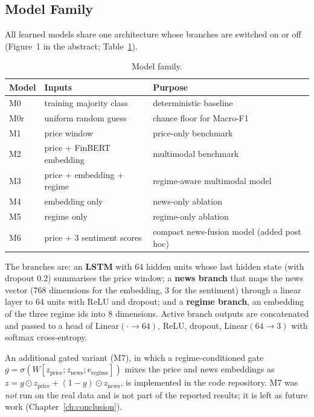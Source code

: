 \subsection{Model Family}
All learned models share one architecture whose branches are switched on or off (Figure~1 in the abstract; Table~\ref{tab:models}).
\begin{table}[H]
\centering
\begin{tabular}{llp{6.6cm}}
\toprule
Model & Inputs & Purpose\\
\midrule
M0 & training majority class & deterministic baseline\\
M0r & uniform random guess & chance floor for Macro-F1\\
M1 & price window & price-only benchmark\\
M2 & price + FinBERT embedding & multimodal benchmark\\
M3 & price + embedding + regime & regime-aware multimodal model\\
M4 & embedding only & news-only ablation\\
M5 & regime only & regime-only ablation\\
M6 & price + 3 sentiment scores & compact news-fusion model (added post hoc)\\
\bottomrule
\end{tabular}
\caption{Model family.}\label{tab:models}
\end{table}
The branches are: an \textbf{LSTM} \cite{hochreiter1997} with 64 hidden units whose last hidden state (with dropout 0.2) summarises the price window; a \textbf{news branch} that maps the news vector (768 dimensions for the embedding, 3 for the sentiment) through a linear layer to 64 units with ReLU and dropout; and a \textbf{regime branch}, an embedding of the three regime ids into 8 dimensions. Active branch outputs are concatenated and passed to a head of Linear$(\cdot\to64)$, ReLU, dropout, Linear$(64\to3)$ with softmax cross-entropy.

An additional gated variant (M7), in which a regime-conditioned gate $g=\sigma(W[z_{\text{price}};z_{\text{news}};e_{\text{regime}}])$ mixes the price and news embeddings as $z=g\odot z_{\text{price}}+(1-g)\odot z_{\text{news}}$, is implemented in the code repository. M7 was \emph{not} run on the real data and is not part of the reported results; it is left as future work (Chapter~\ref{ch:conclusion}).

